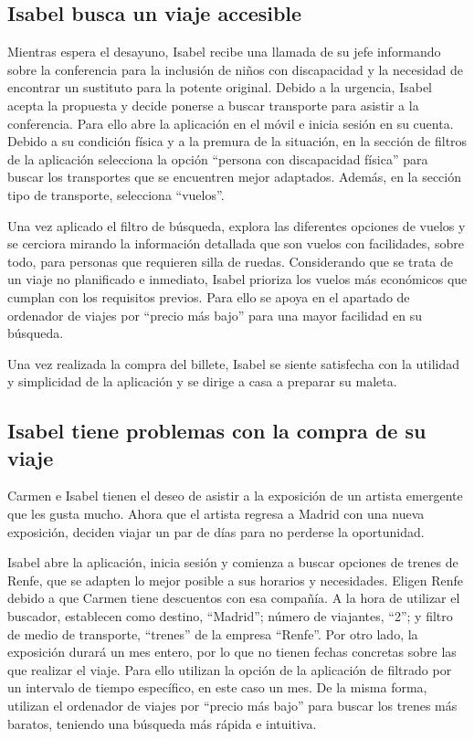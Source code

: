 \subsection{Isabel busca un viaje accesible}

Mientras espera el desayuno, Isabel recibe una llamada de su jefe informando
sobre la conferencia para la inclusión de niños con discapacidad y la necesidad
de encontrar un sustituto para la potente original. Debido a la urgencia,
Isabel acepta la propuesta y decide ponerse a buscar transporte para asistir a
la conferencia. Para ello abre la aplicación en el móvil e inicia sesión en su
cuenta. Debido a su condición física y a la premura de la situación, en la
sección de filtros de la aplicación selecciona la opción “persona con
discapacidad física” para buscar los transportes que se encuentren mejor
adaptados. Además, en la sección tipo de transporte, selecciona “vuelos”.

Una vez aplicado el filtro de búsqueda, explora las diferentes opciones de
vuelos y se cerciora mirando la información detallada que son vuelos con
facilidades, sobre todo, para personas que requieren silla de ruedas.
Considerando que se trata de un viaje no planificado e inmediato, Isabel
prioriza los vuelos más económicos que cumplan con los requisitos previos. Para
ello se apoya en el apartado de ordenador de viajes por “precio más bajo” para
una mayor facilidad en su búsqueda.

Una vez realizada la compra del billete, Isabel se siente satisfecha con la
utilidad y simplicidad de la aplicación y se dirige a casa a preparar su
maleta.

\subsection{Isabel tiene problemas con la compra de su viaje}

Carmen e Isabel tienen el deseo de asistir a la exposición de un artista
emergente que les gusta mucho. Ahora que el artista regresa a Madrid con una
nueva exposición, deciden viajar un par de días para no perderse la
oportunidad.

Isabel abre la aplicación, inicia sesión y comienza a buscar opciones de trenes
de Renfe, que se adapten lo mejor posible a sus horarios y necesidades. Eligen
Renfe debido a que Carmen tiene descuentos con esa compañía. A la hora de
utilizar el buscador, establecen como destino, “Madrid”; número de viajantes,
“2”; y filtro de medio de transporte, “trenes” de la empresa “Renfe”. Por otro
lado, la exposición durará un mes entero, por lo que no tienen fechas concretas
sobre las que realizar el viaje. Para ello utilizan la opción de la aplicación
de filtrado por un intervalo de tiempo específico, en este caso un mes. De la
misma forma, utilizan el ordenador de viajes por “precio más bajo” para buscar
los trenes más baratos, teniendo una búsqueda más rápida e intuitiva.

